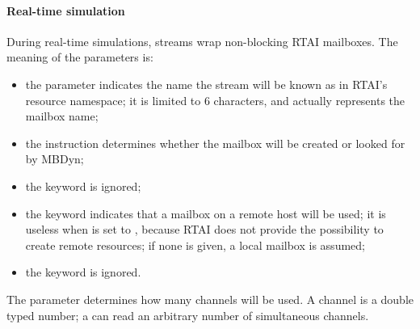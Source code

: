 \paragraph{Real-time simulation}
During real-time simulations, streams wrap non-blocking RTAI mailboxes.
The meaning of the parameters is:
\begin{itemize}
\item the parameter  indicates the name the stream
will be known as in RTAI's resource namespace;
it is limited to 6 characters, and actually represents the mailbox name;
\item the instruction  determines whether the mailbox will be
created or looked for by MBDyn;
\item the keyword  is ignored;
\item the keyword  indicates that a mailbox on a remote host 
will be used; it is useless when  is set to , because
RTAI does not provide the possibility to create remote resources;
if none is given, a local mailbox is assumed;
\item the keyword  is ignored.
\end{itemize}

The parameter  determines how many
channels will be used.
A channel is a double typed number; a  can read
an arbitrary number of simultaneous channels.
